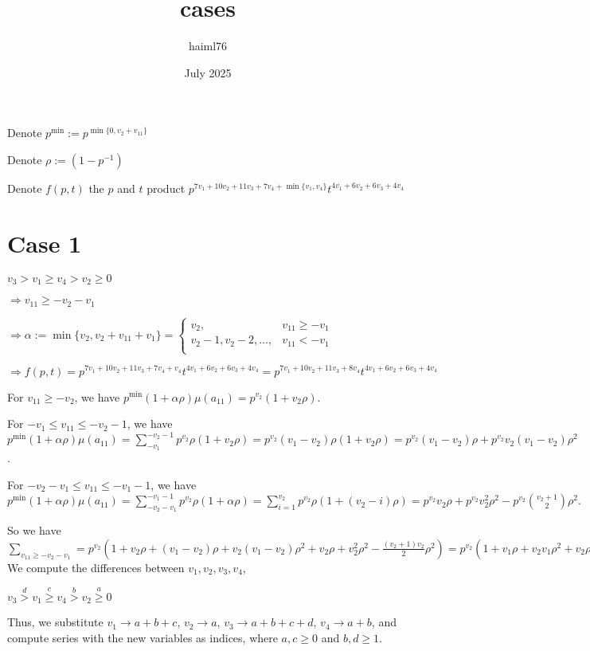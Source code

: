 \documentclass{article}
\title{cases}
\author{haiml76 }
\date{July 2025}
\begin{document}
\maketitle
Denote $p^{\min}:=p^{\min\{0,v_2+v_{11}\}}$

Denote $\rho:=(1-p^{-1})$

Denote $f(p,t)$ the $p$ and $t$ product $p^{7v_1+10v_2+11v_3+7v_4+\min\{v_1,v_4\}}t^{4v_1+6v_2+6v_3+4v_4}$
\section{Case 1}
$v_3>v_1\geq{v_4}>v_2\geq{0}$

$\Rightarrow{v_{11}}\geq{-v_2-v_1}$

$\Rightarrow\alpha:=\min\{v_2,v_2+v_{11}+v_1\}=     \begin{cases}
       v_2, & v_{11}\geq{-v_1}\\
       v_2-1,v_2-2,\dots, & v_{11}<{-v_1}\\
     \end{cases}$

    $\Rightarrow{f(p,t)=p^{7v_1+10v_2+11v_3+7v_4+v_4}t^{4v_1+6v_2+6v_3+4v_4}=p^{7v_1+10v_2+11v_3+8v_4}t^{4v_1+6v_2+6v_3+4v_4}}$

For $v_{11}\geq{-v_2}$, we have $p^{\min}(1+\alpha\rho)\mu(a_{11})=p^{v_2}(1+v_2\rho)$.

For $-v_1\leq{v_{11}}\leq{-v_2-1}$, we have $p^{\min}(1+\alpha\rho)\mu(a_{11})=\sum_{-v_1}^{-v_2-1}p^{v_2}\rho(1+v_2\rho)=p^{v_2}(v_1-v_2)\rho(1+v_2\rho)=p^{v_2}(v_1-v_2)\rho+p^{v_2}v_2(v_1-v_2)\rho^2$.

For $-v_2-v_1\leq{v_{11}}\leq{-v_1-1}$, we have $p^{\min}(1+\alpha\rho)\mu(a_{11})=\sum_{-v_2-v_1}^{-v_1-1}p^{v_2}\rho(1+\alpha\rho)=\sum_{i=1}^{v_2}p^{v_2}\rho(1+(v_2-i)\rho)=p^{v_2}v_2\rho+p^{v_2}v_2^2\rho^2-p^{v_2}\binom{v_2+1}{2}\rho^2.$

So we have $\sum_{v_{11}\geq{-v_2-v_1}}=p^{v_2}(1+v_2\rho+(v_1-v_2)\rho+v_2(v_1-v_2)\rho^2+v_2\rho+v_2^2\rho^2-\frac{(v_2+1)v_2}{2}\rho^2)=p^{v_2}(1+v_1\rho+v_2v_1\rho^2+v_2\rho-\frac{v_2^2}{2}\rho^2-\frac{v_2}{2}\rho^2).$
We compute the differences between $v_1,v_2,v_3,v_4$,

$v_3\overset{d}{>}v_1\overset{c}{\geq}{v_4}\overset{b}>v_2\overset{a}{\geq}{0}$

Thus, we substitute $v_1\rightarrow{a+b+c}$, $v_2\rightarrow{a}$, $v_3\rightarrow{a+b+c+d}$, $v_4\rightarrow{a+b}$, and compute series with the new variables as indices, where $a,c\geq{0}$ and $b,d\geq{1}$.
\end{document}

